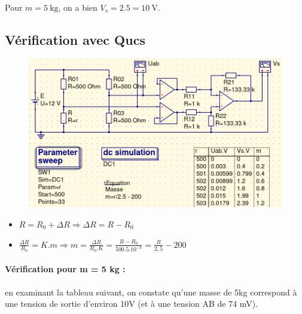 \documentclass{article}
\begin{document}
\paragraph{} Pour $m = \SI{5}{\kilogram}$, on a bien $V_s = 2.5 = \SI{10}{\volt}$.

\subsection{Vérification avec Qucs}

\begin{figure}[H]
    \centering
    \includegraphics[width=0.9\linewidth]{./images/cond-balance-qucs.png}
\end{figure}

\begin{itemize}
    \item $R = R_0 + \Delta R \Rightarrow \Delta R = R - R_0$
    \item $\frac{\Delta R}{R_0} = K.m \Rightarrow m = \frac{\Delta R}{R_0.K} = \frac{R - R_0}{500.5.10^{-3}} = \frac{R}{2,5} - 200$
\end{itemize}

\paragraph{Vérification pour m = 5 kg :} en examinant la tableau suivant, on constate qu'une masse de 5kg correspond à une tension de sortie d'environ 10V (et à une tension AB de 74 mV).
\end{document}
